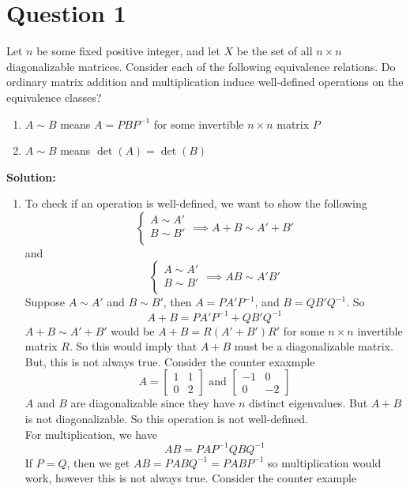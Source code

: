 \documentclass[openany]{report}
\begin{document}
\section{Question 1}
Let $n$ be some fixed positive integer, and let $X$ be the set of all $n \times n$ diagonalizable matrices. Consider each of the following equivalence relations. Do ordinary matrix addition and multiplication induce well-defined operations on the equivalence classes? 
\begin{enumerate}[label=(\alph*)]
    \item $A \sim B$ means $A = PBP^{-1}$ for some invertible $n \times n$ matrix $P$
    \item $A \sim B$ means $\det(A) = \det(B)$
\end{enumerate}
\textbf{Solution:} 
\begin{enumerate}[label=(\alph*)]
    \item To check if an operation is well-defined, we want to show the following
    \[\begin{cases}
        A \sim A' \\
        B \sim B' \\
    \end{cases} \implies A + B \sim A' + B'\]
    and 
    \[\begin{cases}
        A \sim A' \\
        B \sim B' \\
    \end{cases} \implies AB \sim A'B'\]
    Suppose $A \sim A'$ and $B \sim B'$, then $A = PA'P^{-1}$, and $B = QB'Q^{-1}$. So
    \[A + B = PA'P^{-1} + QB'Q^{-1}\]
    $A + B \sim A' + B'$ would be $A + B = R (A' + B') R'$ for some $n \times n$ invertible matrix $R$. So this would imply that $A + B$ must be a diagonalizable matrix. But, this is not always true. Consider the counter exaxmple 
    \[A = \begin{bmatrix}
        1 & 1 \\
        0 & 2
    \end{bmatrix} \text{ and } \begin{bmatrix}
        -1 & 0 \\
        0 & -2
    \end{bmatrix}\]
    $A$ and $B$ are diagonalizable since they have $n$ distinct eigenvalues. But $A + B$ is not diagonalizable. So this operation is not well-defined.\\[2ex]
    For multiplication, we have 
    \[AB = PAP^{-1}QBQ^{-1}\]
    If $P = Q$, then we get $AB = PABQ^{-1} = PABP^{-1}$ so multiplication would work, however this is not always true. Consider the counter example

\end{enumerate}
\end{document}
